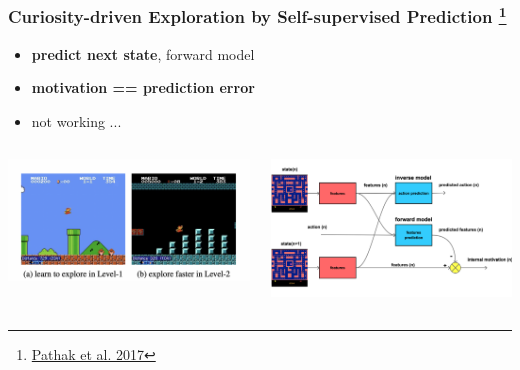 \documentclass{beamer}
\begin{document}
  
  \begin{frame}
  
    \frametitle{Curiosity-driven Exploration by Self-supervised Prediction
                \footnote{\href{https://arxiv.org/pdf/1705.05363.pdf}{Pathak et al. 2017}} }
  
      \begin{itemize}
        \item {\bf predict next state}, forward model
        \item {\bf motivation == prediction error}
        \item not working ...
      \end{itemize}
  
      \begin{columns}
  
        \begin{column}{0.5\textwidth}
          \centering
          \includegraphics[scale=0.25]{../papers_captions/icm.png}
        \end{column}
  
        \begin{column}{0.5\textwidth}
          \centering
          \includegraphics[scale=0.1]{../diagrams/internal_motivation/icm.png}
        \end{column}
      
      \end{columns}
      
  \end{frame}
  
\end{document}

